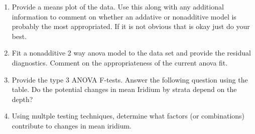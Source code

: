\documentclass[]{article}
\begin{document}
\begin{enumerate}
\def\labelenumi{\arabic{enumi}.}
\item
  Provide a means plot of the data. Use this along with any additional
  information to comment on whether an addative or nonadditive model is
  probably the most appropriated. If it is not obvious that is okay just
  do your best.
\item
  Fit a nonadditive 2 way anova model to the data set and provide the
  residual diagnostics. Comment on the appropriateness of the current
  anova fit.
\item
  Provide the type 3 ANOVA F-tests. Answer the following question using
  the table. Do the potential changes in mean Iridium by strata depend
  on the depth?
\item
  Using multple testing techniques, determine what factors (or
  combinations) contribute to changes in mean iridium.
\end{enumerate}
\end{document}

